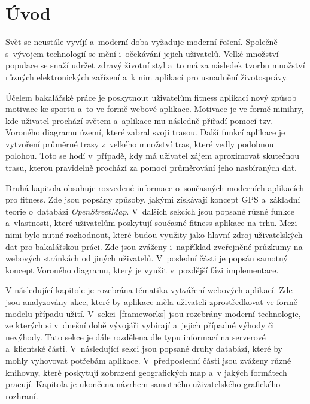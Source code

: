 \listoffigures

\chapter{Úvod}
Svět se neustále vyvíjí a~moderní doba vyžaduje moderní řešení. Společně s~vývojem technologií se mění i~očekávání jejich uživatelů. Velké množství populace se snaží udržet zdravý životní styl a~to má za následek tvorbu množství různých elektronických zařízení a~k nim aplikací pro usnadnění životosprávy.
    
Účelem bakalářské práce je poskytnout uživatelům fitness aplikací nový způsob motivace ke sportu a~to ve formě webové aplikace. Motivace je ve formě minihry, kde uživatel prochází světem a~aplikace mu následně přiřadí pomocí tzv. Voroného diagramu území, které zabral svoji trasou. Další funkcí aplikace je vytvoření průměrné trasy z~velkého množství tras, které vedly podobnou polohou. Toto se hodí v~případě, kdy má uživatel zájem aproximovat skutečnou trasu, kterou pravidelně prochází za pomocí průměrování jeho nasbíraných dat.
    
Druhá kapitola obsahuje rozvedené informace o~současných moderních aplikacích pro fitness. Zde jsou popsány způsoby, jakými získávají koncept GPS a~základní teorie o~databázi \emph{OpenStreetMap}. V~dalších sekcích jsou popsané různé funkce a~vlastnosti, které uživatelům poskytují současné fitness aplikace na trhu. Mezi nimi bylo nutné rozhodnout, které budou využity jako hlavní zdroj uživatelských dat pro bakalářskou práci. Zde jsou zváženy i~například zveřejněné průzkumy na webových stránkách od jiných uživatelů. V~poslední části je popsán samotný koncept Voroného diagramu, který je využit v~pozdější fázi implementace.
    
V následující kapitole je rozebrána tématika vytváření webových aplikací. Zde jsou analyzovány akce, které by aplikace měla uživateli zprostředkovat ve formě modelu případu užití. V~sekci~\ref{frameworks} jsou rozebrány moderní technologie, ze kterých si v~dnešní době vývojáři vybírají a~jejich případné výhody či nevýhody. Tato sekce je dále rozdělena dle typu informací na serverové a~klientské části. V~následující sekci jsou popsané druhy databází, které by mohly vyhovovat potřebám aplikace. V~předposlední části jsou zváženy různé knihovny, které poskytují zobrazení geografických map a~v jakých formátech pracují. Kapitola je ukončena návrhem samotného uživatelského grafického rozhraní.

